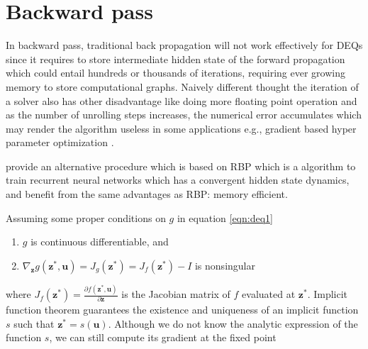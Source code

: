 \documentclass[twoside]{article}
\begin{document}






\clearpage
\appendix

\thispagestyle{empty}


\onecolumn \makesupplementtitle
\section{Backward pass}
\label{sec:backward_pass}

In backward pass, traditional back propagation will not work effectively for DEQs since it requires to store intermediate hidden state of the forward propagation which could entail hundreds or thousands of iterations, requiring ever growing memory to store computational graphs. 
Naively different thought the iteration of a solver also has other disadvantage like doing more floating point operation and as the number of unrolling steps increases, the numerical error accumulates which may render the algorithm useless in some applications e.g., gradient based hyper parameter optimization \cite{hypertuning}.

\cite{DEQ} provide an alternative procedure which is based on RBP which is a algorithm to train recurrent neural networks which has a convergent hidden state dynamics, and benefit from the same advantages as RBP: memory efficient. 

Assuming some proper conditions on $g$ in equation \ref{eqn:deq1}
\begin{enumerate}
    \item $g$ is continuous differentiable, and
    \item $\nabla_\mathbf{z} g(\mathbf{z}^*, \mathbf{u}) = J_{g}(\mathbf{z}^*) = J_{f}(\mathbf{z}^*)- I$ is nonsingular
\end{enumerate}
where $J_{f}(\mathbf{z}^*)=\frac{\partial f\left(\mathbf{z}^{*}, \mathbf{u}\right)}{\partial \mathbf{z}}$ is the Jacobian matrix of $f$ evaluated at $\mathbf{z}^{*}$. 
Implicit function theorem guarantees the existence and uniqueness of an implicit function $s$ such that $\mathbf{z}^{*}=s\left(\mathbf{u}\right)$. Although we do not know the analytic expression of the function $s$, we can still compute its gradient at the fixed point
\end{document}
